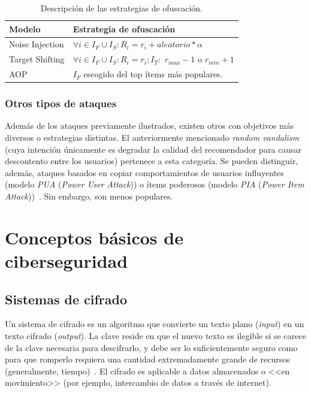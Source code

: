 \begin{table}
\small
\begin{centering}
	
		\begin{tabular}{@{}p{10em} p{20em}@{}}
		\toprule
		\textbf{Modelo} & \textbf{Estrategia de ofuscación}\\ 
		\midrule
			
		Noise Injection & $\forall i \in I_F \cup I_S: R_i = r_i + aleatorio * \alpha$\\
		Target Shifting & $\forall i \in I_F \cup I_S: R_i = r_i; I_T:$ $r_{max}-1$ o $r_{min}+1$\\
		AOP & $I_F$ escogido del top ítems más populares.\\
			
		\bottomrule
		\end{tabular}

\end{centering}
\caption{Descripción de las estrategias de ofuscación.}	\label{tabla_descripcion_estrategias_ofuscación}
\end{table}

\subsubsection{Otros tipos de ataques}

Además de los ataques previamente ilustrados, existen otros con objetivos más diversos o estrategias distintas. El anteriormente mencionado \textit{random vandalism} (cuya intención únicamente es degradar la calidad del recomendador para causar descontento entre los usuarios) pertenece a esta categoría. Se pueden distinguir, además, ataques basados en copiar comportamientos de usuarios influyentes (modelo \textit{PUA} (\textit{Power User Attack})) o ítems poderosos (modelo \textit{PIA} (\textit{Power Item Attack}))~\cite{mingdan2018ShillingAttacksAReview}. Sin embargo, son menos populares.




\section{Conceptos básicos de ciberseguridad}

\subsection{Sistemas de cifrado}

Un sistema de cifrado es un algoritmo que convierte un texto plano (\textit{input}) en un texto cifrado (\textit{output}). La clave reside en que el nuevo texto es ilegible si se carece de la clave necesaria para descifrarlo, y debe ser lo suficientemente seguro como para que romperlo requiera una cantidad extremadamente grande de recursos (generalmente, tiempo)~\cite{cifradoAvast}. El cifrado es aplicable a datos almacenados o <<en movimiento>> (por ejemplo, intercambio de datos a través de internet).

